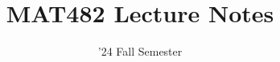 \documentclass[11pt]{scrartcl}
\begin{document}
\title{MAT482 Lecture Notes}
\date{'24 Fall Semester} %
\maketitle

\setcounter{tocdepth}{1}
\tableofcontents
\newpage

 \newpage
\end{document}
